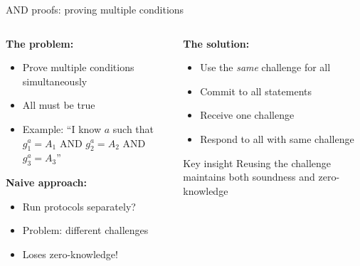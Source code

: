 \documentclass[aspectratio=169, lualatex, handout]{beamer}
\begin{document}
\begin{frame}{AND proofs: proving multiple conditions}
	\begin{columns}[c]
		\begin{column}{0.5\textwidth}
			\textbf{The problem:}
			\begin{itemize}
				\item Prove multiple conditions simultaneously
				\item All must be true
				\item Example: ``I know $a$ such that $g_1^a = A_1$ AND $g_2^a = A_2$ AND $g_3^a = A_3$''
			\end{itemize}
			\textbf{Naive approach:}
			\begin{itemize}
				\item Run protocols separately?
				\item Problem: different challenges
				\item Loses zero-knowledge!
			\end{itemize}
		\end{column}
		\begin{column}{0.5\textwidth}
			\textbf{The solution:}
			\begin{itemize}
				\item Use the \textit{same} challenge for all
				\item Commit to all statements
				\item Receive one challenge
				\item Respond to all with same challenge
			\end{itemize}
			\vspace{0.5em}
			\begin{exampleblock}{Key insight}
				Reusing the challenge maintains both soundness and zero-knowledge
			\end{exampleblock}
		\end{column}
	\end{columns}
\end{frame}
\end{document}
